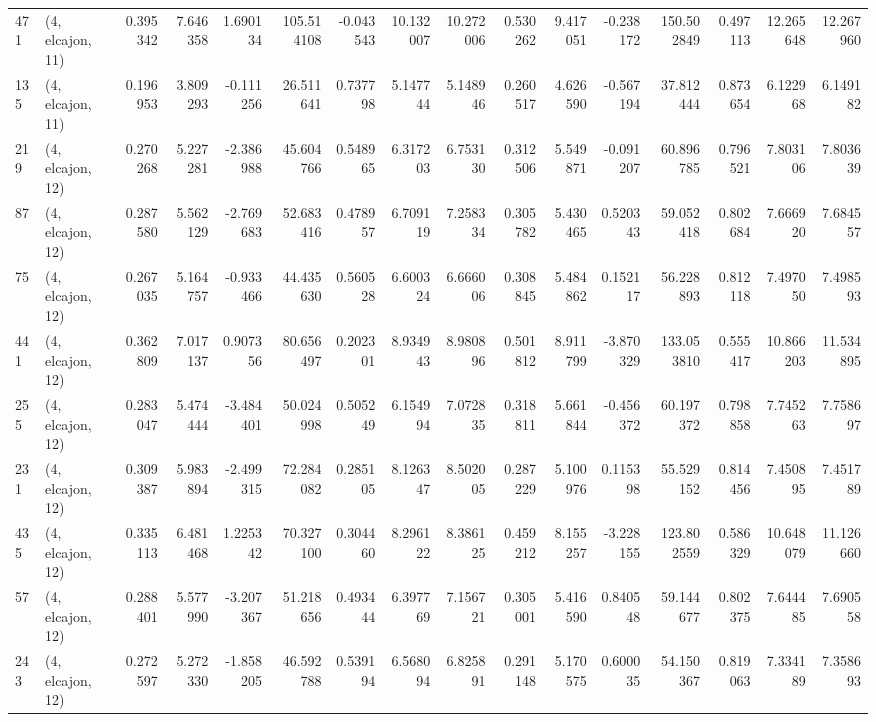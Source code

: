 \begin{tabular}{llrrrrrrrrrrrrrr}
471 &  (4, elcajon, 11) &   0.395342 &   7.646358 &   1.690134 &   105.514108 &  -0.043543 &  10.132007 &  10.272006 &  0.530262 &   9.417051 &  -0.238172 &   150.502849 &  0.497113 &  12.265648 &  12.267960 \\
135 &  (4, elcajon, 11) &   0.196953 &   3.809293 &  -0.111256 &    26.511641 &   0.737798 &   5.147744 &   5.148946 &  0.260517 &   4.626590 &  -0.567194 &    37.812444 &  0.873654 &   6.122968 &   6.149182 \\
219 &  (4, elcajon, 12) &   0.270268 &   5.227281 &  -2.386988 &    45.604766 &   0.548965 &   6.317203 &   6.753130 &  0.312506 &   5.549871 &  -0.091207 &    60.896785 &  0.796521 &   7.803106 &   7.803639 \\
87  &  (4, elcajon, 12) &   0.287580 &   5.562129 &  -2.769683 &    52.683416 &   0.478957 &   6.709119 &   7.258334 &  0.305782 &   5.430465 &   0.520343 &    59.052418 &  0.802684 &   7.666920 &   7.684557 \\
75  &  (4, elcajon, 12) &   0.267035 &   5.164757 &  -0.933466 &    44.435630 &   0.560528 &   6.600324 &   6.666006 &  0.308845 &   5.484862 &   0.152117 &    56.228893 &  0.812118 &   7.497050 &   7.498593 \\
441 &  (4, elcajon, 12) &   0.362809 &   7.017137 &   0.907356 &    80.656497 &   0.202301 &   8.934943 &   8.980896 &  0.501812 &   8.911799 &  -3.870329 &   133.053810 &  0.555417 &  10.866203 &  11.534895 \\
255 &  (4, elcajon, 12) &   0.283047 &   5.474444 &  -3.484401 &    50.024998 &   0.505249 &   6.154994 &   7.072835 &  0.318811 &   5.661844 &  -0.456372 &    60.197372 &  0.798858 &   7.745263 &   7.758697 \\
231 &  (4, elcajon, 12) &   0.309387 &   5.983894 &  -2.499315 &    72.284082 &   0.285105 &   8.126347 &   8.502005 &  0.287229 &   5.100976 &   0.115398 &    55.529152 &  0.814456 &   7.450895 &   7.451789 \\
435 &  (4, elcajon, 12) &   0.335113 &   6.481468 &   1.225342 &    70.327100 &   0.304460 &   8.296122 &   8.386125 &  0.459212 &   8.155257 &  -3.228155 &   123.802559 &  0.586329 &  10.648079 &  11.126660 \\
57  &  (4, elcajon, 12) &   0.288401 &   5.577990 &  -3.207367 &    51.218656 &   0.493444 &   6.397769 &   7.156721 &  0.305001 &   5.416590 &   0.840548 &    59.144677 &  0.802375 &   7.644485 &   7.690558 \\
243 &  (4, elcajon, 12) &   0.272597 &   5.272330 &  -1.858205 &    46.592788 &   0.539194 &   6.568094 &   6.825891 &  0.291148 &   5.170575 &   0.600035 &    54.150367 &  0.819063 &   7.334189 &   7.358693 \\

\end{tabular}
